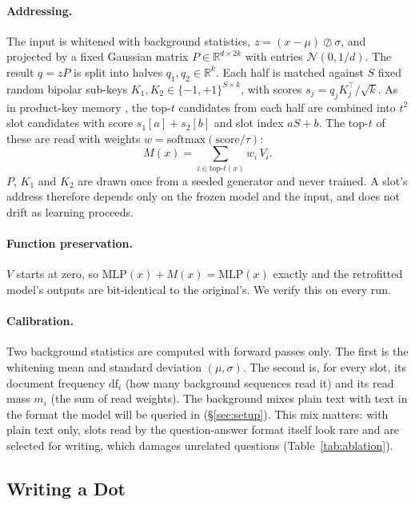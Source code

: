 \documentclass[10pt]{article}
\begin{document}
\paragraph{Addressing.} The input is whitened with background statistics, $z = (x-\mu)\oslash\sigma$, and projected by a fixed Gaussian matrix $P \in \mathbb{R}^{d\times 2k}$ with entries $\mathcal{N}(0, 1/d)$. The result $q = zP$ is split into halves $q_1, q_2 \in \mathbb{R}^{k}$. Each half is matched against $S$ fixed random bipolar sub-keys $K_1, K_2 \in \{-1,+1\}^{S\times k}$, with scores $s_j = q_j K_j^\top/\sqrt{k}$. As in product-key memory \citep{lample2019pkm}, the top-$t$ candidates from each half are combined into $t^2$ slot candidates with score $s_1[a]+s_2[b]$ and slot index $aS+b$. The top-$t$ of these are read with weights $w = \mathrm{softmax}(\text{score}/\tau)$:
\begin{equation}
M(x) = \sum_{i \in \mathrm{top}\text{-}t(x)} w_i\, V_i .
\end{equation}
$P$, $K_1$ and $K_2$ are drawn once from a seeded generator and never trained. A slot's address therefore depends only on the frozen model and the input, and does not drift as learning proceeds.

\paragraph{Function preservation.} $V$ starts at zero, so $\mathrm{MLP}(x) + M(x) = \mathrm{MLP}(x)$ exactly and the retrofitted model's outputs are bit-identical to the original's. We verify this on every run.

\paragraph{Calibration.} Two background statistics are computed with forward passes only. The first is the whitening mean and standard deviation $(\mu, \sigma)$. The second is, for every slot, its document frequency $\mathrm{df}_i$ (how many background sequences read it) and its read mass $m_i$ (the sum of read weights). The background mixes plain text with text in the format the model will be queried in (\S\ref{sec:setup}). This mix matters: with plain text only, slots read by the question-answer format itself look rare and are selected for writing, which damages unrelated questions (Table~\ref{tab:ablation}).

\subsection{Writing a Dot}
\label{sec:write}
\end{document}
